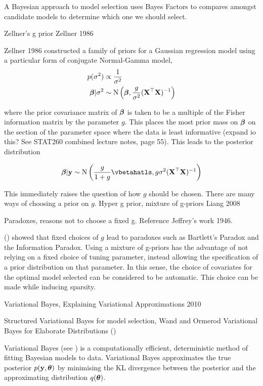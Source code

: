 \documentclass{amsart}[12pt]
\begin{document}
A Bayesian approach to model selection uses Bayes Factors to compares amongst candidate models to determine 
which one we should select.


Zellner's g prior Zellner 1986

Zellner 1986 constructed a family of priors for a Gaussian regression model using a particular form
of conjugate Normal-Gamma model,
\begin{align*}
p(\sigma^2) &\propto \frac{1}{\sigma^2} \\
{\boldsymbol \beta}|\sigma^2 &\sim \text{N}\left({\boldsymbol \beta}, \frac{g}{\sigma^2} ({\bf X}^\top {\bf X})^{-1}\right)
\end{align*}

where the prior covariance matrix of ${\boldsymbol \beta}$ is taken to be a multiple of the Fisher information  matrix by
the parameter $g$. This places the most prior mass on ${\boldsymbol \beta}$ on the section of the parameter space where the
data is least informative (expand io this? See STAT260 combined lecture notes, page 55). This leads to the
posterior distribution

\[
	\vbeta | \vy \sim \N\left(\frac{g}{1+g} \vbetahatls, g \sigma^2 (\mX^\top \mX)^{-1} \right)
\]

This immediately raises the question of how $g$ should be chosen. There are many ways of choosing a prior on
$g$. Hyper g prior, mixture of g-priors Liang 2008

Paradoxes, reasons not to choose a fixed g. Reference Jeffrey's work 1946. \cite{Society2016}

(\cite{Liang2008}) showed that fixed choices of $g$ lead to paradoxes such as Bartlett's Paradox and
the Information Paradox.
Using a mixture of g-priors has the advantage of not relying on a fixed choice of tuning
parameter, instead allowing the specification of a prior distribution on that parameter. In this sense, the 
choice of covariates for the optimal model selected can be considered to be automatic. This choice can be
made while inducing sparsity.


Variational Bayes, Explaining Variational Approximations 2010

Structured Variational Bayes for model selection, Wand and Ormerod Variational Bayes for Elaborate 
Distributions (\cite{Wand2011})


Variational Bayes (see \cite{Ormerod2010}) is a computationally efficient, deterministic method of fitting
Bayesian models to data. Variational Bayes approximates the true posterior $p({\bf y}, {\boldsymbol \theta})$ by minimising the
KL divergence between the posterior and the  approximating distribution $q({\boldsymbol \theta})$.
\end{document}
